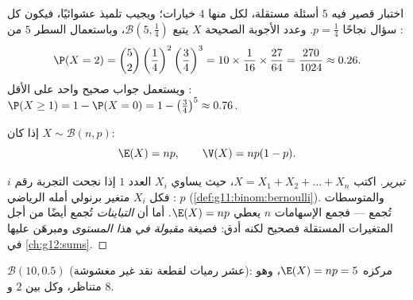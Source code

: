 \begin{example}\label{ex:g11:binom:quiz}
اختبار قصير فيه $5$ أسئلة مستقلة، لكل منها $4$ خيارات؛ ويجيب تلميذ
عشوائيًا، فيكون كل سؤال نجاحًا  $p = \frac14$. وعدد
الأجوبة الصحيحة $X$ يتبع $\mathcal B\left(5, \frac14\right)$،
وباستعمال السطر $5$ من :
\[
\P(X = 2) = \binom52 \left(\frac14\right)^2\left(\frac34\right)^3
= 10 \times \frac{1}{16} \times \frac{27}{64}
= \frac{270}{1024} \approx 0.26 .
\]
ويستعمل  جواب صحيح واحد على الأقل :
$\P(X \geq 1) = 1 - \P(X = 0) = 1 - \left(\frac34\right)^5 \approx
0.76$.
\end{example}

\begin{proposition}\label{prop:g11:binom:expectation}
إذا كان $X \sim \mathcal B(n, p)$:
\[
\E(X) = np,
\qquad
\V(X) = np(1-p).
\]
\end{proposition}

\begin{proof}[تبرير]
اكتب $X = X_1 + X_2 + \dots + X_n$، حيث يساوي $X_i$ العدد $1$ إذا نجحت
التجربة رقم $i$: فكل $X_i$ متغير برنولي أمله الرياضي
$p$ (\cref{def:g11:binom:bernoulli}). والمتوسطات تُجمع --- فجمع الإسهامات $n$
يعطي $\E(X) = np$. أما أن \emph{التباينات} تُجمع أيضًا من أجل
المتغيرات المستقلة فصحيح لكنه أدق: فصيغة 
\emph{مقبولة في هذا المستوى} ومبرهَن عليها في \cref{ch:g12:sums}.
\end{proof}

\begin{omfigure}

{\small {} $\mathcal B(10, 0.5)$ (عشر رميات لقطعة نقد غير مغشوشة):
مركزه $\E(X) = np = 5$، وهو متناظر، وكل  
بين $2$ و $8$.}
\end{omfigure}

